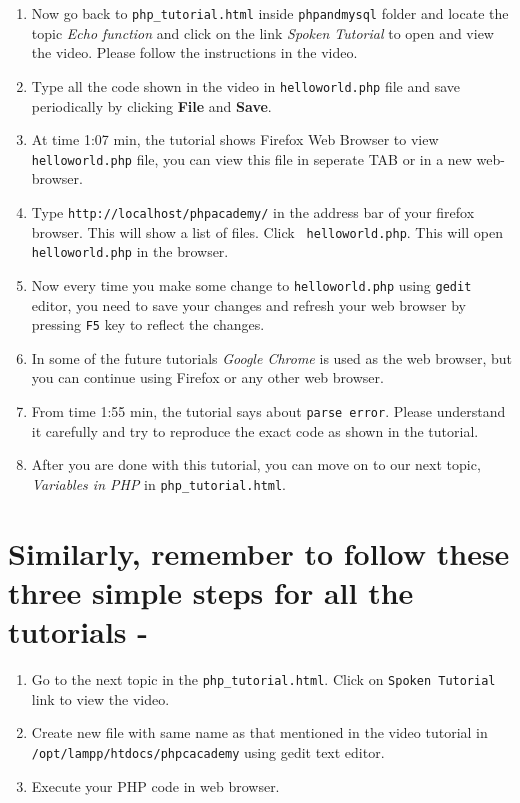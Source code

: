 \documentclass[11pt]{article}
\newenvironment{enumcpt}{\begin{enumerate} \topsep 0pt \partopsep 0pt 
    \parsep 0pt
    \itemsep 0pt \leftmargin -1in \rightmargin 0pt
}{\end{enumerate}}
\begin{document}
\begin{multicols}{2}
\begin{enumcpt}
  \item Now go back to {\tt php\_tutorial.html} inside {\tt phpandmysql}
    folder and locate the topic \emph{Echo function} and click on the
    link \emph{Spoken Tutorial} to open and view the video. Please
    follow the instructions in the video.
  \item Type all the code shown in the video in {\tt helloworld.php}
    file and save periodically by clicking \textbf{File} and
    \textbf{Save}.
  \item At time 1:07 min, the tutorial shows Firefox Web Browser to view
    {\tt helloworld.php} file, you can view this file in seperate TAB or
    in a new web-browser.
  \item Type {\tt http://localhost/phpacademy/} in the address bar of
    your firefox browser. This will show a list of files. Click {\tt
      helloworld.php}. This will open {\tt helloworld.php} in the
    browser.
  \item Now every time you make some change to {\tt helloworld.php}
    using {\tt gedit} editor, you need to save your changes and refresh
    your web browser by pressing {\tt F5} key to reflect the changes.
  \item In some of the future tutorials \emph{Google Chrome} is used as
    the web browser, but you can continue using Firefox or any other web
    browser.
  \item From time 1:55 min, the tutorial says about {\tt parse
    error}. Please understand it carefully and try to reproduce the
    exact code as shown in the tutorial.
  \item After you are done with this tutorial, you can move on to our
    next topic, \emph{Variables in PHP} in {\tt php\_tutorial.html}.
  \end{enumcpt}

  \section{Similarly, remember to follow these three simple steps for all the tutorials - }
  \begin{enumcpt}
  \item Go to the next topic in the {\tt php\_tutorial.html}. Click on {\tt Spoken Tutorial} link to view the video.
  \item Create new file with same name as that mentioned in the video tutorial in {\tt /opt/lampp/htdocs/phpcacademy} using gedit text editor.
  \item Execute your PHP code in web browser.
  \end{enumcpt}

\end{multicols}
\end{document}
